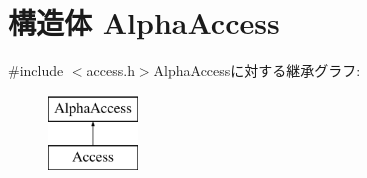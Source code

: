 \hypertarget{structAlphaAccess}{
\section{構造体 AlphaAccess}
\label{structAlphaAccess}
}


{\ttfamily \#include $<$access.h$>$}AlphaAccessに対する継承グラフ:\begin{figure}[H]
\begin{center}
\leavevmode
\includegraphics[height=2cm]{structAlphaAccess}
\end{center}
\end{figure}
